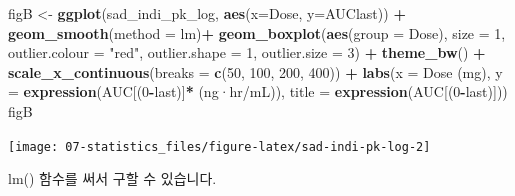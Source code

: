 \documentclass[
  12pt,
]{krantz}
\newenvironment{Shaded}{\begin{snugshade}}{\end{snugshade}}
\newcommand{\DataTypeTok}[1]{\textcolor[rgb]{0.13,0.29,0.53}{#1}}
\newcommand{\DecValTok}[1]{\textcolor[rgb]{0.00,0.00,0.81}{#1}}
\newcommand{\KeywordTok}[1]{\textcolor[rgb]{0.13,0.29,0.53}{\textbf{#1}}}
\newcommand{\NormalTok}[1]{#1}
\newcommand{\OperatorTok}[1]{\textcolor[rgb]{0.81,0.36,0.00}{\textbf{#1}}}
\newcommand{\StringTok}[1]{\textcolor[rgb]{0.31,0.60,0.02}{#1}}
\begin{document}
\begin{Shaded}
\begin{Highlighting}[]
\NormalTok{figB \textless{}{-}}\StringTok{ }\KeywordTok{ggplot}\NormalTok{(sad\_indi\_pk\_log, }\KeywordTok{aes}\NormalTok{(}\DataTypeTok{x=}\NormalTok{Dose, }\DataTypeTok{y=}\NormalTok{AUClast)) }\OperatorTok{+}
\StringTok{  }\KeywordTok{geom\_smooth}\NormalTok{(}\DataTypeTok{method =} \StringTok{\textquotesingle{}lm\textquotesingle{}}\NormalTok{)}\OperatorTok{+}
\StringTok{  }\KeywordTok{geom\_boxplot}\NormalTok{(}\KeywordTok{aes}\NormalTok{(}\DataTypeTok{group =}\NormalTok{ Dose), }
               \DataTypeTok{size =} \DecValTok{1}\NormalTok{, }
               \DataTypeTok{outlier.colour =} \StringTok{"red"}\NormalTok{, }
               \DataTypeTok{outlier.shape =} \DecValTok{1}\NormalTok{, }
               \DataTypeTok{outlier.size =} \DecValTok{3}\NormalTok{) }\OperatorTok{+}
\StringTok{  }\KeywordTok{theme\_bw}\NormalTok{() }\OperatorTok{+}
\StringTok{  }\KeywordTok{scale\_x\_continuous}\NormalTok{(}\DataTypeTok{breaks =} \KeywordTok{c}\NormalTok{(}\DecValTok{50}\NormalTok{, }\DecValTok{100}\NormalTok{, }\DecValTok{200}\NormalTok{, }\DecValTok{400}\NormalTok{)) }\OperatorTok{+}
\StringTok{  }\KeywordTok{labs}\NormalTok{(}\DataTypeTok{x =} \StringTok{\textquotesingle{}Dose (mg)\textquotesingle{}}\NormalTok{, }\DataTypeTok{y =} \KeywordTok{expression}\NormalTok{(}\StringTok{\textquotesingle{}AUC\textquotesingle{}}\NormalTok{[(}\DecValTok{0}\OperatorTok{{-}}\NormalTok{last)]}\OperatorTok{*}\StringTok{\textquotesingle{} (ng·hr/mL)\textquotesingle{}}\NormalTok{),}
       \DataTypeTok{title =} \KeywordTok{expression}\NormalTok{(}\StringTok{\textquotesingle{}AUC\textquotesingle{}}\NormalTok{[(}\DecValTok{0}\OperatorTok{{-}}\NormalTok{last)]))}
\NormalTok{figB}
\end{Highlighting}
\end{Shaded}

\texttt{[image: 07-statistics\_files/figure-latex/sad-indi-pk-log-2]}

lm() 함수를 써서 구할 수 있습니다.
\end{document}
